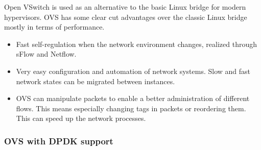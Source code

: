 \documentclass[11pt,a4paper,twoside,openright,bachelor,english]{netthesis}
\begin{document}
Open VSwitch is used as an alternative to the basic Linux bridge for modern hypervisors. OVS has some clear cut advantages over the classic Linux bridge mostly in terms of performance. 
\begin{itemize}

\item Fast self-regulation when the network environment changes, realized through sFlow and Netflow. 

\item Very easy configuration and automation of network systems. Slow and fast network states can be migrated between instances. 

\item OVS can manipulate packets to enable a better administration of different flows. This means especially changing tags in packets or reordering them. This can speed up the network processes. 

\end{itemize}
\cite{pothuraju2016measuring}

\subsubsection{OVS with DPDK support}
\end{document}
